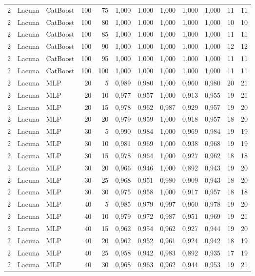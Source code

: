 \begin{longtable}{@{}rllrrrrrrrrr@{}}
2 & Lacuna & CatBoost & 100 & 75 & 1,000 & 1,000 & 1,000 & 1,000 & 1,000 & 11 & 11 \\
2 & Lacuna & CatBoost & 100 & 80 & 1,000 & 1,000 & 1,000 & 1,000 & 1,000 & 10 & 10 \\
2 & Lacuna & CatBoost & 100 & 85 & 1,000 & 1,000 & 1,000 & 1,000 & 1,000 & 11 & 11 \\
2 & Lacuna & CatBoost & 100 & 90 & 1,000 & 1,000 & 1,000 & 1,000 & 1,000 & 12 & 12 \\
2 & Lacuna & CatBoost & 100 & 95 & 1,000 & 1,000 & 1,000 & 1,000 & 1,000 & 11 & 11 \\
2 & Lacuna & CatBoost & 100 & 100 & 1,000 & 1,000 & 1,000 & 1,000 & 1,000 & 11 & 11 \\
2 & Lacuna & MLP & 20 & 5 & 0,989 & 0,980 & 1,000 & 0,960 & 0,980 & 20 & 21 \\
2 & Lacuna & MLP & 20 & 10 & 0,977 & 0,957 & 1,000 & 0,913 & 0,955 & 19 & 21 \\
2 & Lacuna & MLP & 20 & 15 & 0,978 & 0,962 & 0,987 & 0,929 & 0,957 & 19 & 20 \\
2 & Lacuna & MLP & 20 & 20 & 0,979 & 0,959 & 1,000 & 0,918 & 0,957 & 18 & 20 \\
2 & Lacuna & MLP & 30 & 5 & 0,990 & 0,984 & 1,000 & 0,969 & 0,984 & 19 & 19 \\
2 & Lacuna & MLP & 30 & 10 & 0,981 & 0,969 & 1,000 & 0,938 & 0,968 & 19 & 19 \\
2 & Lacuna & MLP & 30 & 15 & 0,978 & 0,964 & 1,000 & 0,927 & 0,962 & 18 & 18 \\
2 & Lacuna & MLP & 30 & 20 & 0,966 & 0,946 & 1,000 & 0,892 & 0,943 & 19 & 20 \\
2 & Lacuna & MLP & 30 & 25 & 0,968 & 0,951 & 0,980 & 0,909 & 0,943 & 18 & 20 \\
2 & Lacuna & MLP & 30 & 30 & 0,975 & 0,958 & 1,000 & 0,917 & 0,957 & 18 & 18 \\
2 & Lacuna & MLP & 40 & 5 & 0,985 & 0,979 & 0,997 & 0,960 & 0,978 & 19 & 20 \\
2 & Lacuna & MLP & 40 & 10 & 0,979 & 0,972 & 0,987 & 0,951 & 0,969 & 19 & 21 \\
2 & Lacuna & MLP & 40 & 15 & 0,962 & 0,954 & 0,962 & 0,927 & 0,944 & 19 & 20 \\
2 & Lacuna & MLP & 40 & 20 & 0,962 & 0,952 & 0,961 & 0,924 & 0,942 & 18 & 19 \\
2 & Lacuna & MLP & 40 & 25 & 0,958 & 0,942 & 0,983 & 0,892 & 0,935 & 17 & 19 \\
2 & Lacuna & MLP & 40 & 30 & 0,968 & 0,963 & 0,962 & 0,944 & 0,953 & 19 & 21 \\

\end{longtable}
